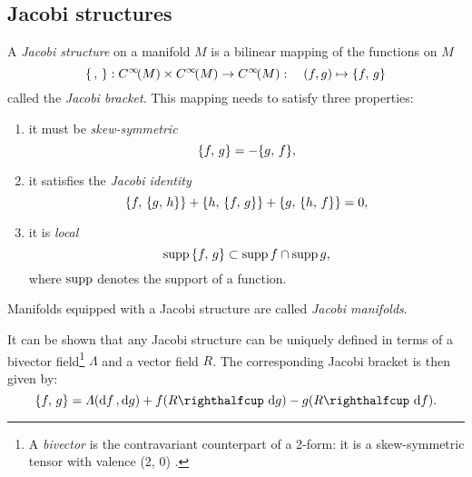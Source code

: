 \subsection{Jacobi structures}
A \emph{Jacobi structure} on a manifold \(M\) is a bilinear mapping of the functions on \(M\) \cite{marle1991}
\begin{equation}
     \{\,,\,\}: C^\infty\!\qty(M)\times C^\infty\!\qty(M) \to C^\infty\!\qty(M): \quad (f, g) \mapsto \{f,\,g\}
\end{equation}
called the \emph{Jacobi bracket}. This mapping needs to satisfy three properties:
\begin{enumerate}[label=(\roman*), noitemsep, align=left, leftmargin=1.5cm]
    \item it must be \emph{skew-symmetric}
        \begin{equation}
     \{f,\,g\} = -\{g,\,f\},
\end{equation}
    \item it satisfies the \emph{Jacobi identity}
        \begin{equation}
     \{f,\,\{g,\,h\}\} + \{h,\,\{f,\,g\}\} + \{g,\,\{h,\,f\}\} = 0,
\end{equation}
    \item it is \emph{local}
        \begin{equation}
     \operatorname{supp}{\{f,\,g\}} \subset \operatorname{supp}{f} \cap \operatorname{supp}{g},
\end{equation}
        where \(\operatorname{supp}\) denotes the support of a function.
\end{enumerate}
Manifolds equipped with a Jacobi structure are called \emph{Jacobi manifolds}.

It can be shown that any Jacobi structure can be uniquely defined in terms of a bivector field\footnote{A \emph{bivector} is the contravariant counterpart of a 2-form: it is a skew-symmetric tensor with valence (2, 0) \cite{einstein1944}.} \(\Lambda\) and a vector field \(R\). The corresponding Jacobi bracket is then given by: \cite{Libermann1987,marle1991}
\begin{equation}
     \jacobi{f}{g} = \Lambda(\dd{f}, \dd{g}) + f (\intpr{R}{\dd{g}}) - g (\intpr{R}{\dd{f}}).
\end{equation}

